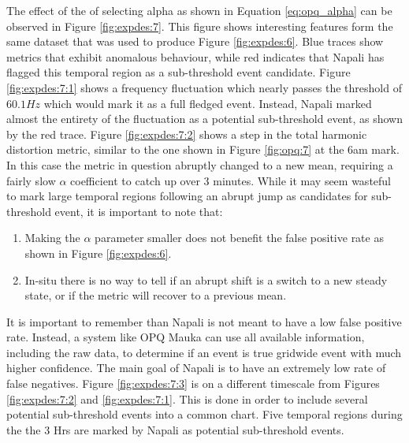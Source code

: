 The effect of the of selecting alpha as shown in Equation \ref{eq:opq_alpha} can be observed in Figure \ref{fig:expdes:7}.
This figure shows interesting features form the same dataset that was used to produce Figure \ref{fig:expdes:6}.
Blue traces show metrics that exhibit anomalous behaviour, while red indicates that Napali has flagged this temporal region as a sub-threshold event candidate.
Figure \ref{fig:expdes:7:1} shows a frequency fluctuation which nearly passes the threshold of $60.1Hz$ which would mark it as a full fledged event.
Instead, Napali marked almost the entirety of the fluctuation as a potential sub-threshold event, as shown by the red trace.
Figure \ref{fig:expdes:7:2} shows a step in the total harmonic distortion metric, similar to the one shown in Figure \ref{fig:opq:7} at the 6am mark.
In this case the metric in question abruptly changed to a new mean, requiring a fairly slow $\alpha$ coefficient to catch up over 3 minutes.
While it may seem wasteful to mark large temporal regions following an abrupt jump as candidates for sub-threshold event, it is important to note that:
\begin{enumerate}
    \item Making the $\alpha$ parameter smaller does not benefit the false positive rate as shown in Figure \ref{fig:expdes:6}.
    \item In-situ there is no way to tell if an abrupt shift is a switch to a new steady state, or if the metric will recover to a previous mean.
\end{enumerate}
It is important to remember than Napali is not meant to have a low false positive rate.
Instead, a system like OPQ Mauka can use all available information, including the raw data, to determine if an event is true gridwide event with much higher confidence.
The main goal of Napali is to have an extremely low rate of false negatives.
Figure \ref{fig:expdes:7:3} is on a different timescale from Figures \ref{fig:expdes:7:2} and \ref{fig:expdes:7:1}.
This is done in order to include several potential sub-threshold events into a common chart.
Five temporal regions during the the 3 Hrs are marked by Napali as potential sub-threshold events.
